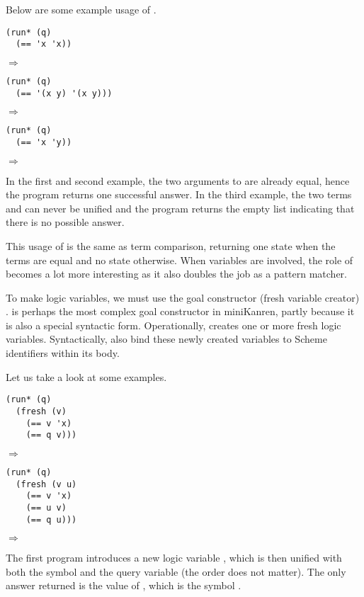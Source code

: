Below are some example usage of \code{==}.
\begin{lstlisting}
(run* (q)
  (== 'x 'x))
\end{lstlisting}
$\Rightarrow$ 

\begin{lstlisting}
(run* (q)
  (== '(x y) '(x y)))
\end{lstlisting}
$\Rightarrow$ 

\begin{lstlisting}
(run* (q)
  (== 'x 'y))
\end{lstlisting}
$\Rightarrow$ \code{()}

In the first and second example, the two arguments to \code{==} are already equal, hence the program returns one successful answer. In the third example, the two terms  and  can never be unified and the program returns the empty list indicating that there is no possible answer.

This usage of \code{==} is the same as term comparison, returning one state when the terms are equal and no state otherwise. When variables are involved, the role of \code{==} becomes a lot more interesting as it also doubles the job as a pattern matcher.

To make logic variables, we must use the goal constructor (fresh variable creator) .  is perhaps the most complex goal constructor in miniKanren, partly because it is also a special syntactic form. Operationally,  creates one or more fresh logic variables. Syntactically,  also bind these newly created variables to Scheme identifiers within its body.

Let us take a look at some examples.

\begin{lstlisting}
(run* (q)
  (fresh (v)
    (== v 'x)
    (== q v)))
\end{lstlisting}
$\Rightarrow$ 

\begin{lstlisting}
(run* (q)
  (fresh (v u)
    (== v 'x)
    (== u v)
    (== q u)))
\end{lstlisting}
$\Rightarrow$ 

The first program introduces a new logic variable , which is then unified with both the symbol  and the query variable  (the order does not matter). The only answer returned is the value of , which is the symbol .

